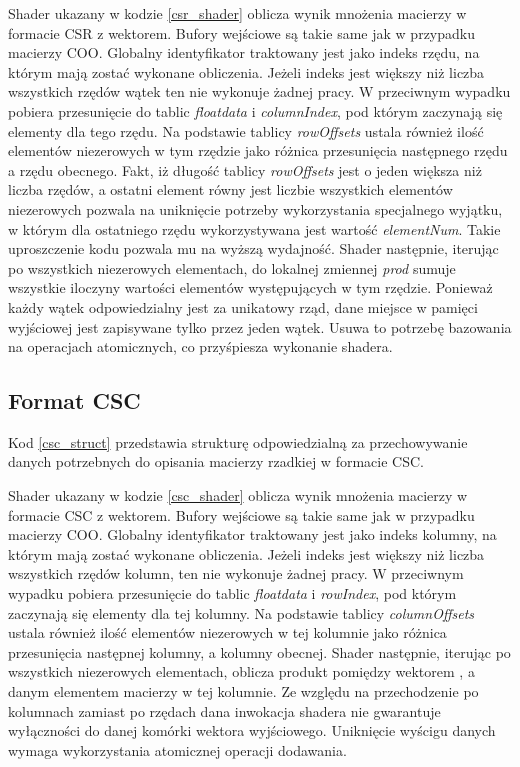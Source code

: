Shader ukazany w kodzie \ref{csr_shader} oblicza wynik mnożenia macierzy w formacie CSR z wektorem.
Bufory wejściowe są takie same jak w przypadku macierzy COO.
Globalny identyfikator traktowany jest jako indeks rzędu, na którym mają zostać wykonane obliczenia.
Jeżeli indeks jest większy niż liczba wszystkich rzędów wątek ten nie wykonuje żadnej pracy.
W przeciwnym wypadku pobiera przesunięcie do tablic \textit{floatdata} i \textit{columnIndex}, pod którym zaczynają się elementy dla tego rzędu.
Na podstawie tablicy \textit{rowOffsets} ustala również ilość elementów niezerowych w tym rzędzie jako różnica przesunięcia następnego rzędu a rzędu obecnego.
Fakt, iż długość tablicy \textit{rowOffsets} jest o jeden większa niż liczba rzędów, a ostatni element równy jest liczbie wszystkich elementów niezerowych pozwala na uniknięcie potrzeby wykorzystania specjalnego wyjątku, w którym dla ostatniego rzędu wykorzystywana jest wartość \textit{elementNum}.
Takie uproszczenie kodu pozwala mu na wyższą wydajność.
Shader następnie, iterując po wszystkich niezerowych elementach, do lokalnej zmiennej \textit{prod} sumuje wszystkie iloczyny wartości elementów występujących w tym rzędzie.
Ponieważ każdy wątek odpowiedzialny jest za unikatowy rząd, dane miejsce w pamięci wyjściowej jest zapisywane tylko przez jeden wątek. 
Usuwa to potrzebę bazowania na operacjach atomicznych, co przyśpiesza wykonanie shadera.

\subsection{Format CSC}
\label{cha:csc_impl}

Kod \ref{csc_struct} przedstawia strukturę odpowiedzialną za przechowywanie danych potrzebnych do opisania macierzy rzadkiej w formacie CSC.

Shader ukazany w kodzie \ref{csc_shader} oblicza wynik mnożenia macierzy w formacie CSC z wektorem.
Bufory wejściowe są takie same jak w przypadku macierzy COO.
Globalny identyfikator traktowany jest jako indeks kolumny, na którym mają zostać wykonane obliczenia.
Jeżeli indeks jest większy niż liczba wszystkich rzędów kolumn, ten nie wykonuje żadnej pracy.
W przeciwnym wypadku pobiera przesunięcie do tablic \textit{floatdata} i \textit{rowIndex}, pod którym zaczynają się elementy dla tej kolumny.
Na podstawie tablicy \textit{columnOffsets} ustala również ilość elementów niezerowych w tej kolumnie jako różnica przesunięcia następnej kolumny, a kolumny obecnej.
Shader następnie, iterując po wszystkich niezerowych elementach, oblicza produkt pomiędzy wektorem , a danym elementem macierzy w tej kolumnie.
Ze względu na przechodzenie po kolumnach zamiast po rzędach dana inwokacja shadera nie gwarantuje wyłączności do danej komórki wektora wyjściowego.
Uniknięcie wyścigu danych wymaga wykorzystania atomicznej operacji dodawania.

